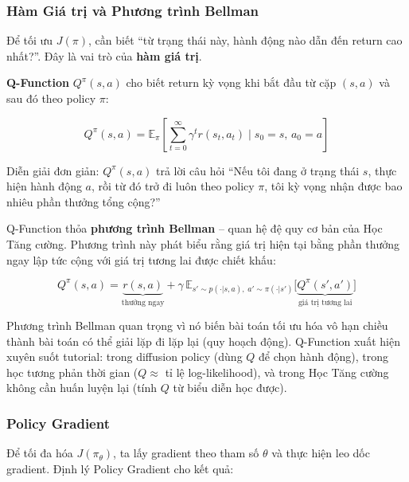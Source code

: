 \subsubsection{Hàm Giá trị và Phương trình Bellman}
 
Để tối ưu $J(\pi)$, cần biết ``từ trạng thái này, hành động nào dẫn
đến return cao nhất?''. Đây là vai trò của \textbf{hàm giá trị}.
 
\textbf{Q-Function} $Q^\pi(s, a)$ cho biết return kỳ vọng khi bắt đầu
từ cặp $(s, a)$ và sau đó theo policy $\pi$:
 
\begin{equation}
    Q^\pi(s, a) = \mathbb{E}_\pi \left[ \sum_{t=0}^{\infty} \gamma^t
    r(s_t, a_t) \;\Big|\; s_0 = s,\, a_0 = a \right]
    \label{eq:q_function}
\end{equation}

Diễn giải đơn giản: $Q^\pi(s, a)$ trả lời câu hỏi ``Nếu tôi đang ở
trạng thái $s$, thực hiện hành động $a$, rồi từ đó trở đi luôn theo
policy $\pi$, tôi kỳ vọng nhận được bao nhiêu phần thưởng tổng
cộng?''
 
Q-Function thỏa \textbf{phương trình Bellman} -- quan hệ đệ quy cơ bản
của Học Tăng cường. Phương trình này phát biểu rằng giá trị hiện tại bằng phần
thưởng ngay lập tức cộng với giá trị tương lai được chiết khấu:
 
\begin{equation}
    Q^\pi(s, a) = \underbrace{r(s, a)}_{\text{thưởng ngay}} +
    \gamma \, \mathbb{E}_{s' \sim p(\cdot|s,a),\;
    a' \sim \pi(\cdot|s')} \bigl[ \underbrace{Q^\pi(s', a')}_{\text{giá trị tương lai}} \bigr]
    \label{eq:bellman}
\end{equation}
 
Phương trình Bellman quan trọng vì nó biến bài toán tối ưu hóa vô hạn
chiều thành bài toán có thể giải lặp đi lặp lại (quy hoạch động).
Q-Function xuất hiện xuyên suốt tutorial: trong diffusion policy
(dùng $Q$ để chọn hành động), trong học tương phản thời gian
($Q \approx$ tỉ lệ log-likelihood), và trong Học Tăng cường không cần huấn luyện lại (tính $Q$
từ biểu diễn học được).
 
\subsubsection{Policy Gradient}
 
Để tối đa hóa $J(\pi_\theta)$, ta lấy gradient theo tham số $\theta$
và thực hiện leo dốc gradient. Định lý Policy Gradient cho kết quả:
 
